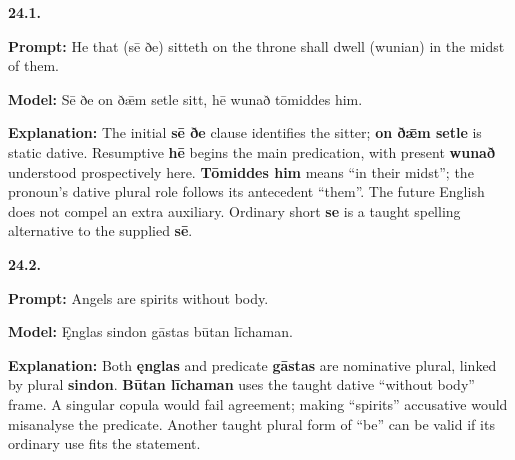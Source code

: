 \par\begin{minipage}{\linewidth}\raggedright
\textbf{24.1.}

\textbf{Prompt:} He that (sē ðe) sitteth on the throne shall dwell (wunian) in the midst of them.

\textbf{Model:} Sē ðe on ðǣm setle sitt, hē wunað tōmiddes him.

\textbf{Explanation:} The initial \textbf{sē ðe} clause identifies the sitter; \textbf{on ðǣm setle} is static dative. Resumptive \textbf{hē} begins the main predication, with present \textbf{wunað} understood prospectively here. \textbf{Tōmiddes him} means “in their midst”; the pronoun’s dative plural role follows its antecedent “them”. The future English does not compel an extra auxiliary. Ordinary short \textbf{se} is a taught spelling alternative to the supplied \textbf{sē}.

\end{minipage}\par\addvspace{4pt}

\par\begin{minipage}{\linewidth}\raggedright
\textbf{24.2.}

\textbf{Prompt:} Angels are spirits without body.

\textbf{Model:} Ęnglas sindon gāstas būtan līchaman.

\textbf{Explanation:} Both \textbf{ęnglas} and predicate \textbf{gāstas} are nominative plural, linked by plural \textbf{sindon}. \textbf{Būtan līchaman} uses the taught dative “without body” frame. A singular copula would fail agreement; making “spirits” accusative would misanalyse the predicate. Another taught plural form of “be” can be valid if its ordinary use fits the statement.

\end{minipage}\par\addvspace{4pt}

